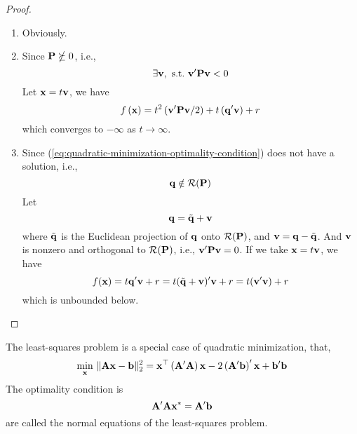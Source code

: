 \begin{proof}
	\hfill
	\begin{enumerate}
		\item
		      Obviously.

		\item
		      Since ${\bf P}\nsucceq 0$, i.e.,
		      \begin{equation*}
			      \exists\bfv,\ \text{s.t.}\ \bfv^{\prime}\bfP\bfv<0
		      \end{equation*}
		      Let ${\bf x}=t{\bf v}$, we have
		      \begin{equation*}
			      f\left({\bf x}\right)=t^{2}\left({\bf v}^{\prime}{\bf P}{\bf v}/2\right)+t\left({\bf q}^{\prime}{\bf v}\right)+r
		      \end{equation*}
		      which converges to $-\infty$ as $t\rightarrow\infty$.

		\item
		      Since (\ref{eq:quadratic-minimization-optimality-condition}) does not have a solution, i.e.,
		      \begin{equation*}
			      {\bf q}\notin\mathcal{R}({\bf P})
		      \end{equation*}
		      Let
		      \begin{equation*}
			      {\bf q}=\tilde{{\bf q}}+{\bf v}
		      \end{equation*}
		      where $\tilde{{\bf q}}$ is the Euclidean projection of ${\bf q}$ onto $\mathcal{R}({\bf P})$, and ${\bf v}={\bf q}-\tilde{{\bf q}}$. And ${\bf v}$ is nonzero and orthogonal to $\mathcal{R}({\bf P})$, i.e., ${\bf v}^{\prime}{\bf P}{\bf v}=0$. If we take ${\bf x}=t{\bf v}$, we have
		      \begin{equation*}
			      f({\bf x})=t{\bf q}^{\prime}{\bf v}+r=t(\tilde{{\bf q}}+{\bf v})^{\prime}{\bf v}+r=t({\bf v}^{\prime}{\bf v})+r
		      \end{equation*}
		      which is unbounded below.
	\end{enumerate}
\end{proof}

\begin{remark}
	The least-squares problem is a special case of quadratic minimization, that,
	\begin{equation*}
		\min_{{\bf x}}\,\|{\bf A}{\bf x}-{\bf b}\|_{2}^{2}={\bf x}^{\top}\left({\bf A}^{\prime}{\bf A}\right){\bf x}-2\left({\bf A}^{\prime}{\bf b}\right)^{\prime}{\bf x}+{\bf b}^{\prime}{\bf b}
	\end{equation*}
	The optimality condition is
	\begin{equation*}
		{\bf A}^{\prime}{\bf A}{\bf x}^{*}={\bf A}^{\prime}{\bf b}
	\end{equation*}
	are called the normal equations of the least-squares problem.
\end{remark}

